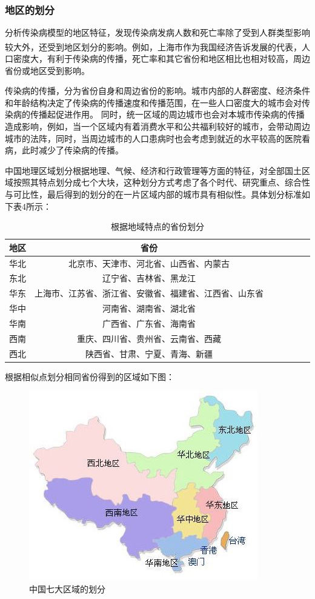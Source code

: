 \documentclass{whutmod}
\begin{document}
\subsubsection{地区的划分}
分析传染病模型的地区特征，发现传染病发病人数和死亡率除了受到人群类型影响较大外，还受到地区划分的影响\textsuperscript{\cite{bib:five}}。例如，上海市作为我国经济告诉发展的代表，人口密度大，有利于传染病的传播，死亡率和其它省份和地区相比也相对较高，周边省份或地区受到影响。

传染病的传播，分为省份自身和周边省份的影响。城市内部的人群密度、经济条件和年龄结构决定了传染病的传播速度和传播范围，在一些人口密度大的城市会对传染病的传播起促进作用。
同时，统一区域的周边城市也会对本城市传染病的传播造成影响，例如，当一个区域内有着消费水平和公共福利较好的城市，会带动周边城市的法阵，同时，当周边城市的人口患病时也会考虑到就近的水平较高的医院看病，此时减少了传染病的传播。

中国地理区域划分根据地理、气候、经济和行政管理等方面的特征，对全部国土区域按照其特点划分成七个大块，这种划分方式考虑了各个时代、研究重点、综合性与可比性，最后得到的划分的在一片区域内部的城市具有相似性。具体划分标准如下表4所示：

\begin{table}[H]
    \caption{根据地域特点的省份划分} \centering
    \begin{tabular*}{13cm}{ccccccc}
    \toprule[1.5pt]
     地区 & 省份 \\
     \midrule[1pt]
      华北 & 北京市、天津市、河北省、山西省、内蒙古 \\
      东北 & 辽宁省、吉林省、黑龙江 \\
      华东 & 上海市、江苏省、浙江省、安徽省、福建省、江西省、山东省 \\
      华中 & 河南省、湖南省、湖北省 \\
      华南 & 广西省、广东省、海南省 \\
      西南 & 重庆、四川省、贵州省、云南省、西藏 \\
      西北 & 陕西省、甘肃、宁夏、青海、新疆 \\
     \bottomrule[1.5pt]
    \end{tabular*}
\end{table}
根据相似点划分相同省份得到的区域如下图：
\begin{figure}[h]
    \centering
    \includegraphics[width=.7\textwidth]{3.png}
    \caption{中国七大区域的划分}
\end{figure}
\end{document}
